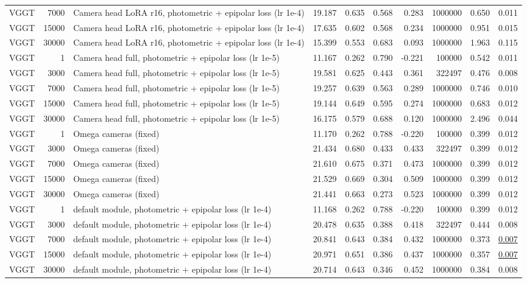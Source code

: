 \begin{table}[H]
\begin{tabular}{lrlrrrrrrr}
VGGT & 7000 & Camera head LoRA r16, photometric + epipolar loss (lr 1e-4) & 19.187 & 0.635 & 0.568 & 0.283 & 1000000 & 0.650 & 0.011 \\
VGGT & 15000 & Camera head LoRA r16, photometric + epipolar loss (lr 1e-4) & 17.635 & 0.602 & 0.568 & 0.234 & 1000000 & 0.951 & 0.015 \\
VGGT & 30000 & Camera head LoRA r16, photometric + epipolar loss (lr 1e-4) & 15.399 & 0.553 & 0.683 & 0.093 & 1000000 & 1.963 & 0.115 \\
VGGT & 1 & Camera head full, photometric + epipolar loss (lr 1e-5) & 11.167 & 0.262 & 0.790 & -0.221 & 100000 & 0.542 & 0.011 \\
VGGT & 3000 & Camera head full, photometric + epipolar loss (lr 1e-5) & 19.581 & 0.625 & 0.443 & 0.361 & 322497 & 0.476 & 0.008 \\
VGGT & 7000 & Camera head full, photometric + epipolar loss (lr 1e-5) & 19.257 & 0.639 & 0.563 & 0.289 & 1000000 & 0.746 & 0.010 \\
VGGT & 15000 & Camera head full, photometric + epipolar loss (lr 1e-5) & 19.144 & 0.649 & 0.595 & 0.274 & 1000000 & 0.683 & 0.012 \\
VGGT & 30000 & Camera head full, photometric + epipolar loss (lr 1e-5) & 16.175 & 0.579 & 0.688 & 0.120 & 1000000 & 2.496 & 0.044 \\
VGGT & 1 & Omega cameras (fixed) & 11.170 & 0.262 & 0.788 & -0.220 & 100000 & 0.399 & 0.012 \\
VGGT & 3000 & Omega cameras (fixed) & 21.434 & 0.680 & 0.433 & 0.433 & 322497 & 0.399 & 0.012 \\
VGGT & 7000 & Omega cameras (fixed) & 21.610 & 0.675 & 0.371 & 0.473 & 1000000 & 0.399 & 0.012 \\
VGGT & 15000 & Omega cameras (fixed) & 21.529 & 0.669 & 0.304 & 0.509 & 1000000 & 0.399 & 0.012 \\
VGGT & 30000 & Omega cameras (fixed) & 21.441 & 0.663 & 0.273 & 0.523 & 1000000 & 0.399 & 0.012 \\
VGGT & 1 & default module, photometric + epipolar loss (lr 1e-4) & 11.168 & 0.262 & 0.788 & -0.220 & 100000 & 0.399 & 0.012 \\
VGGT & 3000 & default module, photometric + epipolar loss (lr 1e-4) & 20.478 & 0.635 & 0.388 & 0.418 & 322497 & 0.444 & 0.008 \\
VGGT & 7000 & default module, photometric + epipolar loss (lr 1e-4) & 20.841 & 0.643 & 0.384 & 0.432 & 1000000 & 0.373 & \underline{0.007} \\
VGGT & 15000 & default module, photometric + epipolar loss (lr 1e-4) & 20.971 & 0.651 & 0.386 & 0.437 & 1000000 & 0.357 & \underline{0.007} \\
VGGT & 30000 & default module, photometric + epipolar loss (lr 1e-4) & 20.714 & 0.643 & 0.346 & 0.452 & 1000000 & 0.384 & 0.008 \\
\bottomrule
\end{tabular}
\end{table}